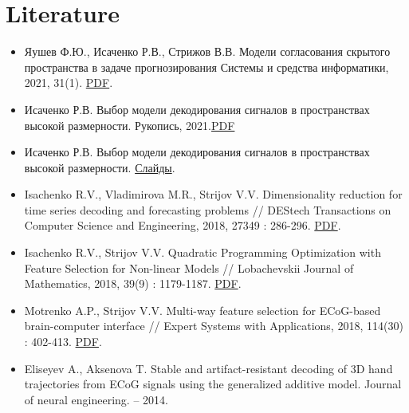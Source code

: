 \documentclass{article}
\begin{document}
\section{Literature}
\renewcommand\labelitemi{$\textasteriskcentered$}
\begin{itemize}
\item  Яушев Ф.Ю., Исаченко Р.В., Стрижов В.В. Модели согласования скрытого пространства в задаче прогнозирования  Системы и средства информатики, 2021, 31(1). \href{http://strijov.com/papers/Isachenko2020CanonicCorrelation.pdf}{PDF}.
\item  Исаченко Р.В. Выбор модели декодирования сигналов в пространствах высокой размерности. Рукопись, 2021.\href{https://github.com/r-isachenko/PhDThesis/raw/master/doc/Isachenko2021PhDThesis.pdf}{PDF} 
\item  Исаченко Р.В. Выбор модели декодирования сигналов в пространствах высокой размерности. \href{https://github.com/r-isachenko/PhDThesis/raw/master/pres/Isachenko2020PhDThesisPres.pdf}{Слайды}.
\item  Isachenko R.V., Vladimirova M.R., Strijov V.V. Dimensionality reduction for time series decoding and forecasting problems // DEStech Transactions on Computer Science and Engineering, 2018, 27349 : 286-296. \href{http://strijov.com/papers/IsachenkoVladimirova2018PLS.pdf}{PDF}. 
\item  Isachenko R.V., Strijov V.V. Quadratic Programming Optimization with Feature Selection for Non-linear Models // Lobachevskii Journal of Mathematics, 2018, 39(9) : 1179-1187. \href{https://rdcu.be/bfR32}{PDF}. 
\item  Motrenko A.P., Strijov V.V. Multi-way feature selection for ECoG-based brain-computer interface // Expert Systems with Applications, 2018, 114(30) : 402-413. \href{http://strijov.com/papers/MotrenkoStrijov2017ECoG_HL_2.pdf}{PDF}. 
\item  Eliseyev A., Aksenova T. Stable and artifact-resistant decoding of 3D hand trajectories from ECoG signals using the generalized additive model. Journal of neural engineering. – 2014.
\end{itemize}
\end{document}
